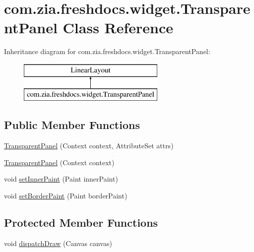 \hypertarget{classcom_1_1zia_1_1freshdocs_1_1widget_1_1_transparent_panel}{\section{com.\-zia.\-freshdocs.\-widget.\-Transparent\-Panel Class Reference}
\label{classcom_1_1zia_1_1freshdocs_1_1widget_1_1_transparent_panel}
}
Inheritance diagram for com.\-zia.\-freshdocs.\-widget.\-Transparent\-Panel\-:\begin{figure}[H]
\begin{center}
\leavevmode
\includegraphics[height=2.000000cm]{classcom_1_1zia_1_1freshdocs_1_1widget_1_1_transparent_panel}
\end{center}
\end{figure}
\subsection*{Public Member Functions}
\begin{DoxyCompactItemize}
\item 
\hyperlink{classcom_1_1zia_1_1freshdocs_1_1widget_1_1_transparent_panel_a77e07116ed6591c73239b59faf800152}{Transparent\-Panel} (Context context, Attribute\-Set attrs)
\item 
\hyperlink{classcom_1_1zia_1_1freshdocs_1_1widget_1_1_transparent_panel_aa59cfc2db80c5a4c68f044f4fc0e2c8b}{Transparent\-Panel} (Context context)
\item 
void \hyperlink{classcom_1_1zia_1_1freshdocs_1_1widget_1_1_transparent_panel_abfadfc45e43bb967f519165a2b72d824}{set\-Inner\-Paint} (Paint inner\-Paint)
\item 
void \hyperlink{classcom_1_1zia_1_1freshdocs_1_1widget_1_1_transparent_panel_afd0059a3b9b739acac14ff12ccc6e631}{set\-Border\-Paint} (Paint border\-Paint)
\end{DoxyCompactItemize}
\subsection*{Protected Member Functions}
\begin{DoxyCompactItemize}
\item 
void \hyperlink{classcom_1_1zia_1_1freshdocs_1_1widget_1_1_transparent_panel_a610a90be3689c00e44ae4f67eaf4fff7}{dispatch\-Draw} (Canvas canvas)
\end{DoxyCompactItemize}


